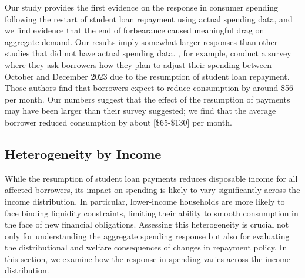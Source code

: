 \documentclass[12pt]{article}
\begin{document}


Our study provides the first evidence on the response in consumer spending following the restart of student loan repayment using actual spending data, and we find evidence that the end of forbearance caused meaningful drag on aggregate demand. Our results imply somewhat larger responses than other studies that did not have actual spending data. \cite{chakrabarti2023borrower}, for example, conduct a survey where they ask borrowers how they plan to adjust their spending between October and December 2023 due to the resumption of student loan repayment. Those authors find that borrowers expect to reduce consumption by around \$56 per month. Our numbers suggest that the effect of the resumption of payments may have been larger than their survey suggested; we find that the average borrower reduced consumption by about [\$65-\$130] per month. 

\subsection{Heterogeneity by Income}

While the resumption of student loan payments reduces disposable income for all affected borrowers, its impact on spending is likely to vary significantly across the income distribution. In particular, lower-income households are more likely to face binding liquidity constraints, limiting their ability to smooth consumption in the face of new financial obligations. Assessing this heterogeneity is crucial not only for understanding the aggregate spending response but also for evaluating the distributional and welfare consequences of changes in repayment policy. \citep[See, for example:][]{boutros_borrow_2022} In this section, we examine how the response in spending varies across the income distribution. 
 
\end{document}
